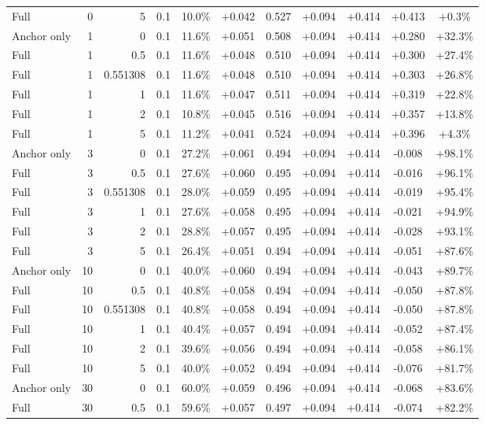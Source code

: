 \begin{table}[htbp]
\begin{tabular}{lrrrccccccc}
Full & 0 & 5 & 0.1 & 10.0\% & +0.042 & 0.527 & +0.094 & +0.414 & +0.413 & +0.3\% \\
Anchor only & 1 & 0 & 0.1 & 11.6\% & +0.051 & 0.508 & +0.094 & +0.414 & +0.280 & +32.3\% \\
Full & 1 & 0.5 & 0.1 & 11.6\% & +0.048 & 0.510 & +0.094 & +0.414 & +0.300 & +27.4\% \\
Full & 1 & 0.551308 & 0.1 & 11.6\% & +0.048 & 0.510 & +0.094 & +0.414 & +0.303 & +26.8\% \\
Full & 1 & 1 & 0.1 & 11.6\% & +0.047 & 0.511 & +0.094 & +0.414 & +0.319 & +22.8\% \\
Full & 1 & 2 & 0.1 & 10.8\% & +0.045 & 0.516 & +0.094 & +0.414 & +0.357 & +13.8\% \\
Full & 1 & 5 & 0.1 & 11.2\% & +0.041 & 0.524 & +0.094 & +0.414 & +0.396 & +4.3\% \\
Anchor only & 3 & 0 & 0.1 & 27.2\% & +0.061 & 0.494 & +0.094 & +0.414 & -0.008 & +98.1\% \\
Full & 3 & 0.5 & 0.1 & 27.6\% & +0.060 & 0.495 & +0.094 & +0.414 & -0.016 & +96.1\% \\
Full & 3 & 0.551308 & 0.1 & 28.0\% & +0.059 & 0.495 & +0.094 & +0.414 & -0.019 & +95.4\% \\
Full & 3 & 1 & 0.1 & 27.6\% & +0.058 & 0.495 & +0.094 & +0.414 & -0.021 & +94.9\% \\
Full & 3 & 2 & 0.1 & 28.8\% & +0.057 & 0.495 & +0.094 & +0.414 & -0.028 & +93.1\% \\
Full & 3 & 5 & 0.1 & 26.4\% & +0.051 & 0.494 & +0.094 & +0.414 & -0.051 & +87.6\% \\
Anchor only & 10 & 0 & 0.1 & 40.0\% & +0.060 & 0.494 & +0.094 & +0.414 & -0.043 & +89.7\% \\
Full & 10 & 0.5 & 0.1 & 40.8\% & +0.058 & 0.494 & +0.094 & +0.414 & -0.050 & +87.8\% \\
Full & 10 & 0.551308 & 0.1 & 40.8\% & +0.058 & 0.494 & +0.094 & +0.414 & -0.050 & +87.8\% \\
Full & 10 & 1 & 0.1 & 40.4\% & +0.057 & 0.494 & +0.094 & +0.414 & -0.052 & +87.4\% \\
Full & 10 & 2 & 0.1 & 39.6\% & +0.056 & 0.494 & +0.094 & +0.414 & -0.058 & +86.1\% \\
Full & 10 & 5 & 0.1 & 40.0\% & +0.052 & 0.494 & +0.094 & +0.414 & -0.076 & +81.7\% \\
Anchor only & 30 & 0 & 0.1 & 60.0\% & +0.059 & 0.496 & +0.094 & +0.414 & -0.068 & +83.6\% \\
Full & 30 & 0.5 & 0.1 & 59.6\% & +0.057 & 0.497 & +0.094 & +0.414 & -0.074 & +82.2\% \\

\end{tabular}
\end{table}
